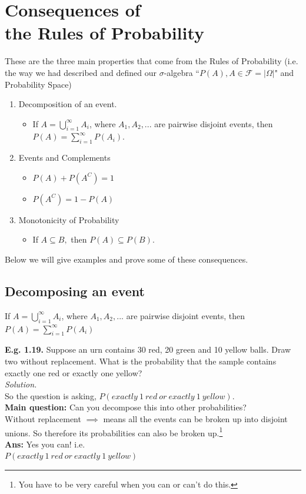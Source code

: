 \documentclass[12pt]{book}
\begin{document}
\section{Consequences of \\the Rules of Probability} 
These are the three main properties that come from the Rules of Probability (i.e. the way we had described and defined our $\sigma$-algebra ``$P(A),A\in\mathcal{F}=|\Omega|$" and Probability Space)
\begin{enumerate}
\item Decomposition of an event.
\begin{itemize} \item If $A = \bigcup\limits_{i=1}^\infty A_i$, where $A_1,A_2,...$ are pairwise disjoint events, then $P(A) = \sum\limits_{i=1}^\infty P(A_i)$.\end{itemize}
\item Events and Complements
	\begin{itemize} 
		\item $P(A)+P(A^C)=1$
		\item $P(A^C)=1-P(A)$
	\end{itemize}
\item Monotonicity of Probability
\begin{itemize} \item If $A\subseteq B,$ then $P(A)\subseteq P(B)$.\end{itemize}
\end{enumerate}
Below we will give examples and prove some of these consequences.

\subsection{Decomposing an event}
If $A = \bigcup\limits_{i=1}^\infty A_i$, where $A_1,A_2,...$ are pairwise disjoint events, then $P(A) = \sum\limits_{i=1}^\infty P(A_i)$

\noindent \textbf{E.g. 1.19. } Suppose an urn contains 30 red, 20 green and 10 yellow balls. Draw two without replacement. What is the probability that the sample contains exactly one red or exactly one yellow?\\ 
\textit{Solution. }\\
So the question is asking, $P(exactly~1~red~or~exactly~1~yellow)$.\\
\textbf{Main question: } Can you decompose this into other probabilities?\\
Without replacement $\implies{}$  means all the events can be broken up into disjoint unions. So therefore its probabilities can also be broken up.\footnote{You have to be very careful when you can or can't do this. }\\
\textbf{Ans: } Yes you can! i.e.\\
$P(exactly~1~red~or~exactly~1~yellow)$\\
\end{document}
